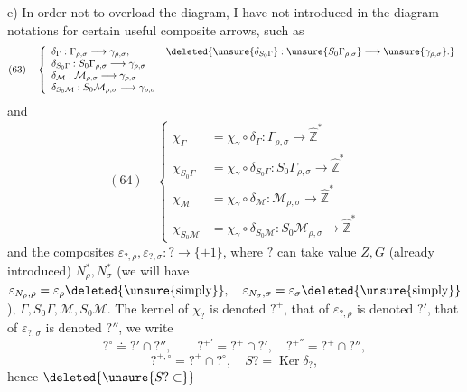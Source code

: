 e) In order not to overload the diagram, I have not introduced in
the diagram notations for certain useful composite arrows,
such as
\[
(63)\quad
\left\{
\begin{array}{ll}
\delta_\Gamma:\Gamma_{\rho,\sigma}\longrightarrow\gamma_{\rho,\sigma},
&
\deleted{\unsure{\delta_{S_0\Gamma}}:
\unsure{S_0\Gamma_{\rho,\sigma}}\longrightarrow
\unsure{\gamma_{\rho,\sigma}}.}\\
\delta_{S_0\Gamma}:S_0\Gamma_{\rho,\sigma}
\longrightarrow\gamma_{\rho,\sigma}&\\
\delta_{\mathcal M}:\mathcal M_{\rho,\sigma}
\longrightarrow\gamma_{\rho,\sigma}&\\
\delta_{S_0\mathcal M}:S_0\mathcal M_{\rho,\sigma}
\longrightarrow\gamma_{\rho,\sigma}&
\end{array}
\right.
\]
and
\[
(64)\quad
\left\{
\begin{aligned}
\chi_\Gamma&=\chi_\gamma\circ\delta_\Gamma:
\Gamma_{\rho,\sigma}\longrightarrow\widehat{\mathbb Z}^{*}\\
\chi_{S_0\Gamma}&=\chi_\gamma\circ\delta_{S_0\Gamma}:
S_0\Gamma_{\rho,\sigma}\longrightarrow\widehat{\mathbb Z}^{*}\\
\chi_{\mathcal M}&=\chi_\gamma\circ\delta_{\mathcal M}:
\mathcal M_{\rho,\sigma}\longrightarrow\widehat{\mathbb Z}^{*}\\
\chi_{S_0\mathcal M}&=\chi_\gamma\circ\delta_{S_0\mathcal M}:
S_0\mathcal M_{\rho,\sigma}\longrightarrow\widehat{\mathbb Z}^{*}
\end{aligned}
\right.
\]
and the composites
\(\varepsilon_{?,\rho},\varepsilon_{?,\sigma}:?\longrightarrow\{\pm1\}\),
where \(?\) can take  value
\(Z,G\) (already introduced) \(N_\rho^*,N_\sigma^*\)
(we will have
\(\varepsilon_{N_\rho,\rho}=\varepsilon_\rho
\deleted{\text{\unsure{simply}}},\quad
\varepsilon_{N_\sigma,\sigma}=\varepsilon_\sigma
\deleted{\text{\unsure{simply}}}\)),
\(\Gamma,S_0\Gamma,\mathcal M,S_0\mathcal M\).
The kernel of \(\chi_?\) is denoted \(?^+\), that of
\(\varepsilon_{?,\rho}\) is denoted \(?'\), that of
\(\varepsilon_{?,\sigma}\) is denoted \(?''\),
we write
\[
?^\circ\doteq?'\cap?'',\qquad
?^{+'}=?^+\cap?',\quad
?^{+''}=?^+\cap?'',
\]
\[
?^{+,\circ}=?^+\cap?^\circ,\quad
S?=\operatorname{Ker}\delta_?,
\]
 hence \(\deleted{\unsure{S?\subset}}\)


